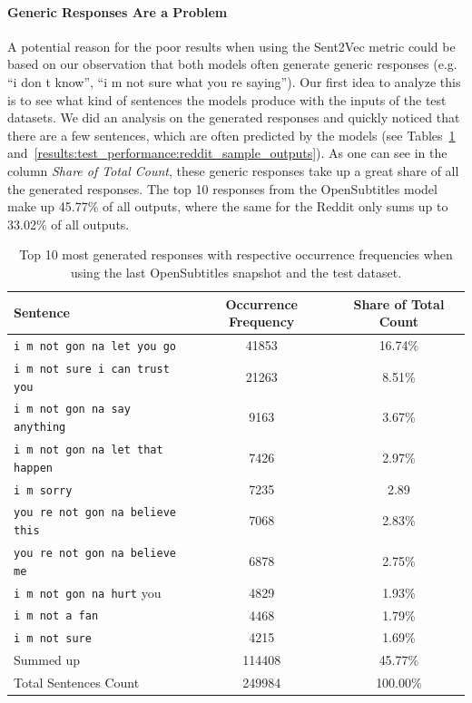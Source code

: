\paragraph{Generic Responses Are a Problem} A potential reason for the poor results when using the Sent2Vec metric could be based on our observation that both models often generate generic responses (e.g. ``i don t know'', ``i m not sure what you re saying''). Our first idea to analyze this is to see what kind of sentences the models produce with the inputs of the test datasets. We did an analysis on the generated responses and quickly noticed that there are a few sentences, which are often predicted by the models (see Tables~\ref{results:test_performance:opensubtitles_sample_outputs} and~\ref{results:test_performance:reddit_sample_outputs}). As one can see in the column \emph{Share of Total Count}, these generic responses take up a great share of all the generated responses. The top 10 responses from the OpenSubtitles model make up 45.77\% of all outputs, where the same for the Reddit only sums up to 33.02\% of all outputs.
\\
\begin{table}[H]
	\centering
	\begin{adjustbox}{max width=\textwidth}
		\begin{tabularx}{\textwidth}{lcc}
			\toprule
			Sentence & Occurrence Frequency & Share of Total Count \\ \midrule
			\texttt{i m not gon na let you go} & 41853 & 16.74\%\\
			\texttt{i m not sure i can trust you} & 21263 & 8.51\%\\
			\texttt{i m not gon na say anything} & 9163 & 3.67\%\\
			\texttt{i m not gon na let that happen} & 7426 & 2.97\%\\
			\texttt{i m sorry} & 7235 & 2.89\\
			\texttt{you re not gon na believe this} & 7068 & 2.83\%\\
			\texttt{you re not gon na believe me} & 6878 & 2.75\%\\
			\texttt{i m not gon na hurt} you & 4829 & 1.93\%\\
			\texttt{i m not a fan} & 4468 & 1.79\%\\
			\texttt{i m not sure} & 4215 & 1.69\%\\
			\midrule
			Summed up & 114408 & 45.77\%\\
			\midrule
			\midrule
			Total Sentences Count & 249984 & 100.00\%\\
			\bottomrule
		\end{tabularx}
	\end{adjustbox}
	\caption{Top 10 most generated responses with respective occurrence frequencies when using the last OpenSubtitles snapshot and the test dataset.}
	\label{results:test_performance:opensubtitles_sample_outputs}
\end{table}

